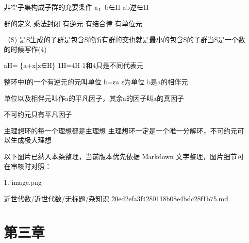 \begin{note}[杂知识]

非空子集构成子群的充要条件 a，b∈H ab逆∈H

群的定义 乘法封闭 有逆元 有结合律 有单位元

（S) 是S生成的子群是包含S的所有群的交也就是最小的包含S的子群当S是一个数的时候写作(4)

aH= \{a+x|x∈H\} 1H=4H 1和4只是不同代表元

整环中I的一个有逆元的元叫单位 b=εa ε为单位 b是a的相伴元

单位以及相伴元叫作a的平凡因子，其余a的因子叫a的真因子

不可约元只有平凡因子

主理想环的每一个理想都是主理想 主理想环一定是一个唯一分解环，不可约元可以生成极大理想

\end{note}

\begin{note}[关联图片]
以下图片已纳入本条整理，当前版本优先依据 Markdown 文字整理，图片细节可在审核时对照：

1. image.png\\

\end{note}

\begin{note}[来源路径]

近世代数/近世代数/无标题/杂知识 20ed2efa3f4280118b08e4bdc28f1b75.md

\end{note}

\section*{第三章}

